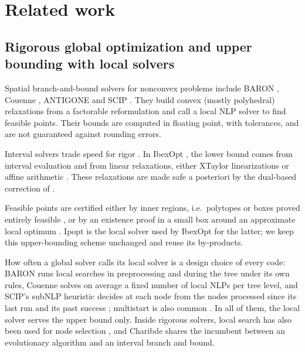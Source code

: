\documentclass[11pt]{article}
\begin{document}
\section{Related work}\label{sec:related}

\subsection{Rigorous global optimization and upper bounding with local solvers}

Spatial branch-and-bound solvers for nonconvex problems include BARON
\citep{RyooSahinidis1996,TawarmalaniSahinidis2005}, Couenne \citep{Belotti2009},
ANTIGONE \citep{MisenerFloudas2014} and SCIP \citep{VigerskeGleixner2018}. They build
convex (mostly polyhedral) relaxations from a factorable reformulation and call a local
NLP solver to find feasible points. Their bounds are computed in floating point, with
tolerances, and are not guaranteed against rounding errors.

Interval solvers trade speed for rigor
\citep{Kearfott1996,HansenWalster2004,Neumaier2004}. In IbexOpt
\citep{ChabertJaulin2009,Trombettoni2011,Araya2014}, the lower bound comes from
interval evaluation and from linear relaxations, either XTaylor linearizations or
affine arithmetic \citep{Ninin2015,Araya2024hybrid}. These relaxations are made safe a
posteriori by the dual-based correction of
\citet{NeumaierShcherbina2004} \citep[see also][]{Jansson2004lp,Guilbeau}.

Feasible points are certified either by inner regions, i.e.\ polytopes or boxes proved
entirely feasible \citep{Araya2014}, or by an existence proof in a small box around an
approximate local optimum \citep{Kearfott2014}. Ipopt \citep{WachterBiegler2006} is
the local solver used by IbexOpt for the latter; we keep this upper-bounding
scheme unchanged and reuse its by-products.

How often a global solver calls its local solver is a design choice of every code:
BARON runs local searches in preprocessing and during the tree under its own rules,
Couenne solves on average a fixed number of local NLPs per tree level, and SCIP's
subNLP heuristic decides at each node from the nodes processed since its last run and
its past success \citep{VigerskeGleixner2018}; multistart is also common
\citep{Ugray2007}. In all of them, the local solver serves the upper bound only. Inside
rigorous solvers, local search has also been used for node selection
\citep{Neveu2016,ReyesAraya2024}, and Charibde \citep{Vanaret2020} shares the
incumbent between an evolutionary algorithm and an interval branch and bound.
\end{document}

